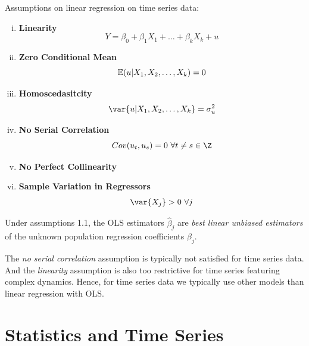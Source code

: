 \documentclass[11pt]{article}
\begin{document}
		\begin{assumption} Assumptions on linear regression on time series data:
			\begin{enumerate}[(i)]
				\item \textbf{Linearity}
					\begin{equation}
						Y = \beta_0 + \beta_1 X_1 + \dots + \beta_k X_k + u
					\end{equation}
				\item \textbf{Zero Conditional Mean}
					\begin{equation}
						\mathbb{E}({u|X_1, X_2, \dots, X_k}) = 0
					\end{equation}
				\item \textbf{Homoscedasitcity}
					\begin{equation}
						\var{u|X_1, X_2, \dots, X_k} = \sigma^2_u
					\end{equation}
				\item \textbf{No Serial Correlation}
					\begin{equation}
						Cov(u_t, u_s) = 0\ \forall t \neq s \in \Z
					\end{equation}
				\item \textbf{No Perfect Collinearity}
				\item \textbf{Sample Variation in Regressors}
					\begin{equation}
						\var{X_j} > 0\ \forall j
					\end{equation}
			\end{enumerate}
		\end{assumption}
		
		\begin{theorem}
			Under assumptions 1.1, the OLS estimators $\hat{\beta}_j$ are \emph{best linear unbiased estimators} of the unknown population regression coefficients $\beta_j$.
		\end{theorem}
		
		\begin{remark}
			The \emph{no serial correlation} assumption is typically not satisfied for time series data. And the \emph{linearity} assumption is also too restrictive for time series featuring complex dynamics. Hence, for time series data we typically use other models than linear regression with OLS.
		\end{remark}
		
	\section{Statistics and Time Series}
\end{document}
